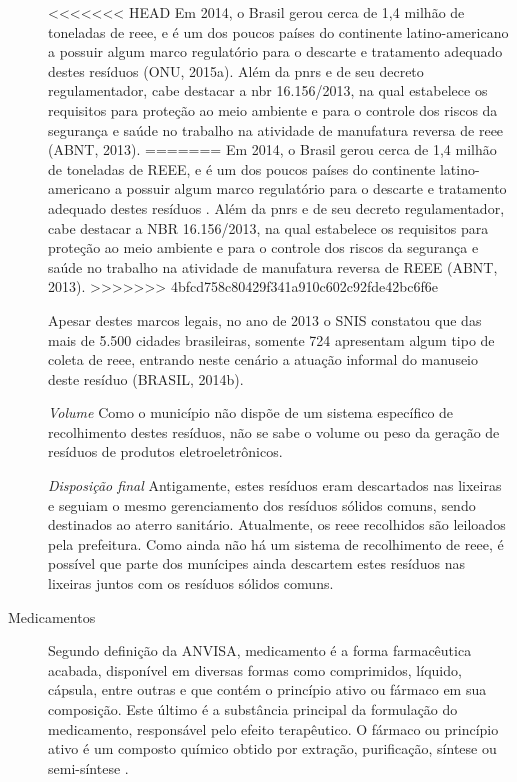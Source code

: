 \begin{description}
<<<<<<< HEAD
	Em 2014, o Brasil gerou cerca de 1,4 milhão de toneladas de \gls{reee}, e é um dos poucos países do continente latino-americano a possuir algum marco regulatório para o descarte e tratamento adequado destes resíduos (ONU, 2015a). Além da \gls{pnrs} e de seu decreto regulamentador, cabe destacar a \gls{nbr} 16.156/2013, na qual estabelece os requisitos para proteção ao meio ambiente e para o controle dos riscos da segurança e saúde no trabalho na atividade de manufatura reversa de \gls{reee} (ABNT, 2013). 
=======
	Em 2014, o Brasil gerou cerca de 1,4 milhão de toneladas de REEE, e é um dos poucos países do continente latino-americano a possuir algum marco regulatório para o descarte e tratamento adequado destes resíduos \cite{WHO2015}. Além da \gls{pnrs} e de seu decreto regulamentador, cabe destacar a NBR 16.156/2013, na qual estabelece os requisitos para proteção ao meio ambiente e para o controle dos riscos da segurança e saúde no trabalho na atividade de manufatura reversa de REEE (ABNT, 2013). 
>>>>>>> 4bfcd758c80429f341a910c602c92fde42bc6f6e
	
	Apesar destes marcos legais, no ano de 2013 o SNIS constatou que das mais de 5.500 cidades brasileiras, somente 724 apresentam algum tipo de coleta de \gls{reee}, entrando neste cenário a atuação informal do manuseio deste resíduo (BRASIL, 2014b).
	
		\subitem \textit{Volume}
		Como o município não dispõe de um sistema específico de recolhimento destes resíduos, não se sabe o volume ou peso da geração de resíduos de produtos eletroeletrônicos.
	
		\subitem \textit{Disposição final}
		Antigamente, estes resíduos eram descartados nas lixeiras e seguiam o mesmo gerenciamento dos resíduos sólidos comuns, sendo destinados ao aterro sanitário. Atualmente, os \gls{reee} recolhidos são leiloados pela prefeitura.
		Como ainda não há um sistema de recolhimento de \gls{reee}, é possível que parte dos munícipes ainda descartem estes resíduos nas lixeiras juntos com os resíduos sólidos comuns.
	
	\item[Medicamentos] Segundo definição da ANVISA, medicamento é a forma farmacêutica acabada, disponível em diversas formas como comprimidos, líquido, cápsula, entre outras e que contém o princípio ativo ou fármaco em sua composição. Este último é a substância principal da formulação do medicamento, responsável pelo efeito terapêutico. O fármaco ou princípio ativo é um composto químico obtido por extração, purificação, síntese ou semi-síntese \cite{anvisa2010}.
	

\end{description}
